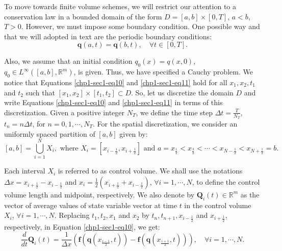 To move towards finite volume schemes, we will restrict our attention
to a conservation law in a bounded domain of the form 
$D = [a,b]\times[0,T]$, $a<b$, $T>0$. However, we must 
impose some boundary condition. One possible way and that we will adopted 
in text are the periodic boundary conditions:
\begin{equation}
        \label{chp1-sec1-eq12}
	\mathbf{q}(a, t) = \mathbf{q}(b, t),\quad \forall t \in [0, T].
\end{equation}

Also, we assume that an initial condition $q_0(x) = q(x,0)$, $q_0 \in L^{\infty}([a,b],\mathbb{R}^m)$, is given.
Thus, we have specified a Cauchy problem.
We notice that Equations \eqref{chp1-sec1-eq10} and \eqref{chp1-sec1-eq11}
hold for all $x_1, x_2, t_1$ and $t_2$ such that
$[x_1, x_2] \times [t_1, t_2] \subset D$.
So, let us discretize the domain $D$ and write 
Equations \eqref{chp1-sec1-eq10} and \eqref{chp1-sec1-eq11} in terms of this discretization.
Given a positive integer $N_T$, we define the time step 
$\Delta t = \frac{T}{N_T}$, $t_n = n \Delta t$, for $n = 0, 1 ,\cdots, N_T$.
For the spatial discretization, we consider an uniformly spaced partition of $[a, b]$ given by: 
\begin{equation}
	\label{chp1-sec1-eq13}
	[a,b] = \bigcup_{i=1}^N X_i, 
	\text{ where } X_i= [x_{i-\frac{1}{2}}, x_{i+\frac{1}{2}}] \text{ and } 
	a = x_{\frac{1}{2}} < x_{\frac{3}{2}} < \cdots < x_{N-\frac{1}{2}} < x_{N+\frac{1}{2}} = b.
\end{equation}

Each interval $X_i$ is referred to as control volume. 
We shall use the notations $\Delta x = x_{i+\frac{1}{2}} - x_{i-\frac{1}{2}}$ 
and $x_i = \frac{1}{2}(x_{i+\frac{1}{2}} + x_{i-\frac{1}{2}})$, $\forall i = 1, \cdots, N$, 
to define the control volume length and midpoint, respectively.
We also denote by $\mathbf{Q}_i(t) \in \mathbb{R}^m$ as the vector of 
average values of state variable vector at time $t$
in the control volume $X_i$, $\forall i = 1, \cdots, N$. Replacing $t_1, t_2, x_1$ and 
$x_2$ by $t_{n}, t_{n+1}, x_{i-\frac{1}{2}}$ and $x_{i+\frac{1}{2}}$,
respectively, in Equation \eqref{chp1-sec1-eq10}, we get:
\begin{equation}
        \label{chp1-sec1-eq14}
	\frac{d}{dt} \mathbf{Q}_i(t) = \frac{1}{\Delta x}
	(\mathbf{f}(\mathbf{q}(x_{\frac{i-1}{2}},t)) -
	\mathbf{f}(\mathbf{q}(x_{\frac{i+1}{2}},t))) ,
	\quad \forall i = 1, \cdots, N.
\end{equation}

